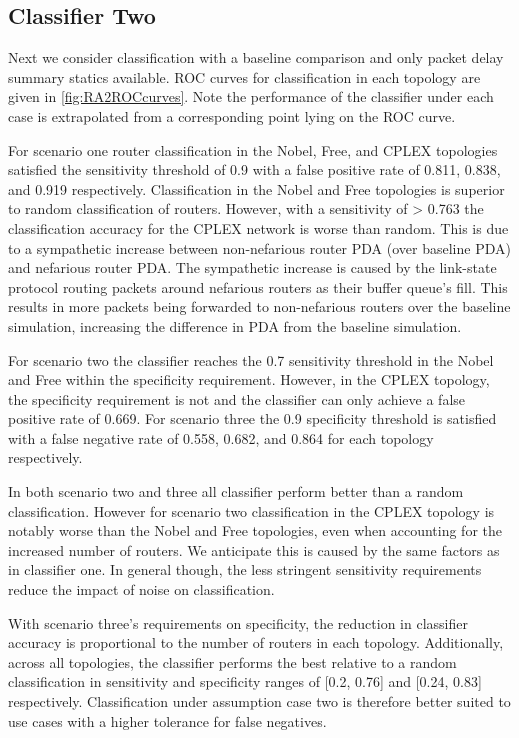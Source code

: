 \subsection{Classifier Two}
\label{ssec:Ras2}
Next we consider classification with a baseline comparison and only packet delay summary statics available. ROC curves for classification in each topology are given in \cref{fig:RA2ROCcurves}. Note the performance of the classifier under each case is extrapolated from a corresponding point lying on the ROC curve.\par
For scenario one router classification in the Nobel, Free, and CPLEX topologies satisfied the sensitivity threshold of 0.9 with a false positive rate of 0.811, 0.838, and 0.919 respectively. Classification in the Nobel and Free topologies is superior to random classification of routers. However, with a sensitivity of > 0.763 the classification accuracy for the CPLEX network is worse than random. This is due to a sympathetic increase between non-nefarious router PDA (over baseline PDA) and nefarious router PDA. The sympathetic increase is caused by the link-state protocol routing packets around nefarious routers as their buffer queue's fill. This results in more packets being forwarded to non-nefarious routers over the baseline simulation, increasing the difference in PDA from the baseline simulation.\par
For scenario two the classifier reaches the 0.7 sensitivity threshold in the Nobel and Free within the specificity requirement. However, in the CPLEX topology, the specificity requirement is not and the classifier can only achieve a false positive rate of 0.669. For scenario three the 0.9 specificity threshold is satisfied with a false negative rate of 0.558, 0.682, and 0.864 for each topology respectively.\par
In both scenario two and three all classifier perform better than a random classification. However for scenario two classification in the CPLEX topology is notably worse than the Nobel and Free topologies, even when accounting for the increased number of routers. We anticipate this is caused by the same factors as in classifier one. In general though, the less stringent sensitivity requirements reduce the impact of noise on classification.\par
With scenario three's requirements on specificity, the reduction in classifier accuracy is proportional to the number of routers in each topology. Additionally, across all topologies, the classifier performs the best relative to a random classification in sensitivity and specificity ranges of [0.2, 0.76] and [0.24, 0.83] respectively. Classification under assumption case two is therefore better suited to use cases with a higher tolerance for false negatives.\par
